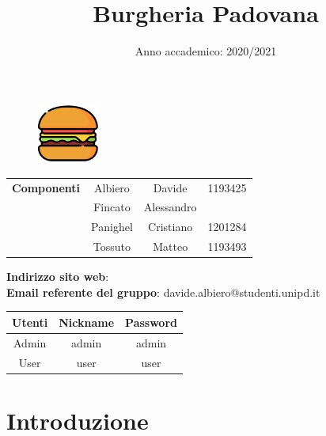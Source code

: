 \documentclass[a4paper, dvipsnames, table]{article}
\begin{document}
\title{Burgheria Padovana}
\date{Anno accademico: 2020/2021}

\newpage  %
\begin{figure}
	\centering
	\includegraphics[width=2cm]{../img/burger-icon.png}%
\end{figure}
\maketitle

\begin{table}
	\centering
	\begin{tabular}{c|c c c}
		\textbf{Componenti}
			& Albiero	& Davide      & 1193425 \\
			& Fincato	& Alessandro  &         \\
 			& Panighel	& Cristiano   & 1201284 \\
			& Tossuto	& Matteo      & 1193493 \\
	\end{tabular}
\end{table}

\begin{center}
	\textbf{Indirizzo sito web}: \\
	\textbf{Email referente del gruppo}: davide.albiero@studenti.unipd.it
\end{center}

\begin{table}
	\centering
	\begin{tabular}{c|c c}
		\textbf{Utenti} & \textbf{Nickname} & \textbf{Password} \\
		\hline
		Admin           & admin & admin             \\
		User            & user  & user              \\
	\end{tabular}
\end{table}

\newpage
	\tableofcontents

\newpage
\section{Introduzione}
	
	
\end{document}
